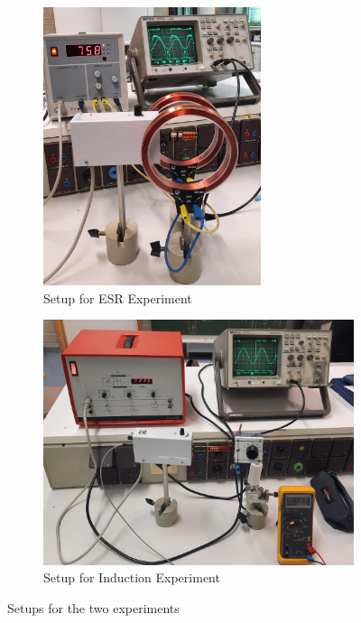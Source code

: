 \documentclass{scrartcl}
\begin{document}
\begin{figure}[H]
     \centering
     \begin{subfigure}[b]{0.45\textwidth}
         \centering
         \includegraphics[width=0.7\textwidth]{bilder/1652518772134.jpg}
         \caption{Setup for ESR Experiment}
         \label{fig:setup_ESR}
     \end{subfigure}
     \hfill
     \begin{subfigure}[b]{0.45\textwidth}
         \centering
         \includegraphics[width=\textwidth]{bilder/1652518991486.jpg}
         \caption{Setup for Induction Experiment}
         \label{fig:setup_induction}
     \end{subfigure}
     \caption{Setups for the two experiments}
     \label{fig:setups}
\end{figure}
\end{document}
